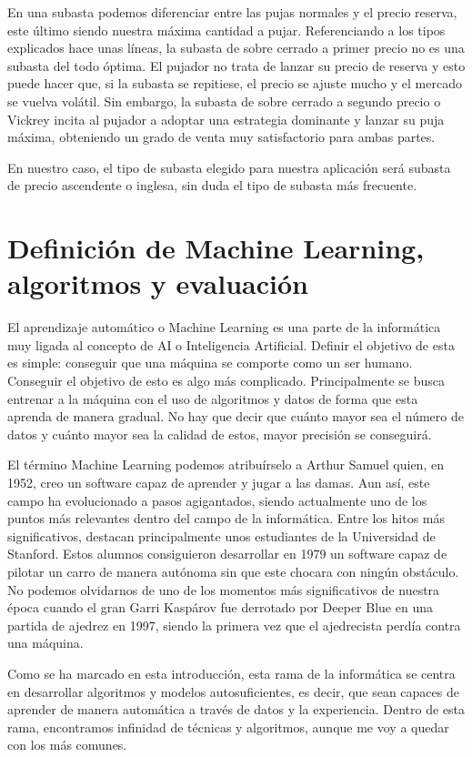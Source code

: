 	En una subasta podemos diferenciar entre las pujas normales y el precio reserva, este último siendo nuestra máxima cantidad a pujar. Referenciando a los tipos explicados hace unas líneas, la subasta de sobre cerrado a primer precio no es una subasta del todo óptima. El pujador no trata de lanzar su precio de reserva y esto puede hacer que, si la subasta se repitiese, el precio se ajuste mucho y el mercado se vuelva volátil. Sin embargo, la subasta de sobre cerrado a segundo precio o Vickrey incita al pujador a adoptar una estrategia dominante y lanzar su puja máxima, obteniendo un grado de venta muy satisfactorio para ambas partes.
	
	En nuestro caso, el tipo de subasta elegido para nuestra aplicación será subasta de precio ascendente o inglesa, sin duda el tipo de subasta más frecuente.
	
	

\section{Definición de Machine Learning, algoritmos y evaluación}

	El aprendizaje automático o Machine Learning es una parte de la informática muy ligada al concepto de AI o Inteligencia Artificial. Definir el objetivo de esta es simple: conseguir que una máquina se comporte como un ser humano. Conseguir el objetivo de esto es algo más complicado. Principalmente se busca entrenar a la máquina con el uso de algoritmos y datos de forma que esta aprenda de manera gradual. No hay que decir que cuánto mayor sea el número de datos y cuánto mayor sea la calidad de estos, mayor precisión se conseguirá. 
	
	El término Machine Learning podemos atribuírselo a Arthur Samuel quien, en 1952, creo un software capaz de aprender y jugar a las damas. Aun así, este campo ha evolucionado a pasos agigantados, siendo actualmente uno de los puntos más relevantes dentro del campo de la informática. Entre los hitos más significativos, destacan principalmente unos estudiantes de la Universidad de Stanford. Estos alumnos consiguieron desarrollar en 1979 un software capaz de pilotar un carro de manera autónoma sin que este chocara con ningún obstáculo.  No podemos olvidarnos de uno de los momentos más significativos de nuestra época cuando el gran Garri Kaspárov fue derrotado por Deeper Blue en una partida de ajedrez en 1997, siendo la primera vez que el ajedrecista perdía contra una máquina.
	
	Como se ha marcado en esta introducción, esta rama de la informática se centra en desarrollar algoritmos y modelos autosuficientes, es decir, que sean capaces de aprender de manera automática a través de datos y la experiencia. Dentro de esta rama, encontramos infinidad de técnicas y algoritmos, aunque me voy a quedar con los más comunes.
	
